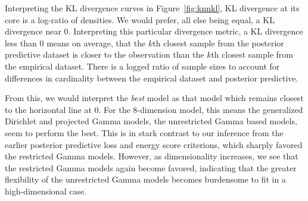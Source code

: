 Interpreting the KL divergence curves in Figure~\ref{fig:knnkl}, KL divergence at its core is a
  log-ratio of densities.  We would prefer, all else being equal, a KL divergence near 0.
  Interpreting this particular divergence metric, a KL divergence less than 0 means on average,
  that the $k$th closest sample from the posterior predictive dataset is closer to the observation
  than the $k$th closest sample from the empirical dataset.  There is a logged ratio of sample sizes
  to account for differences in cardinality between the empirical dataset and posterior predictive.

From this, we would interpret the \emph{best} model as that model which remains closest to the
  horizontal line at $0$.  For the 8-dimension model, this means the generalized Dirichlet and
  projected Gamma models, the unrestricted Gamma based models, seem to perform the best.   This is
  in stark contrast to our inference from the earlier posterior predictive loss and energy score
  criterions, which sharply favored the restricted Gamma models.  However, as dimensionality
  increases, we see that the restricted Gamma models again become favored, indicating that the
  greater flexibility of the unrestricted Gamma models becomes burdensome to fit in a
  high-dimensional case.




